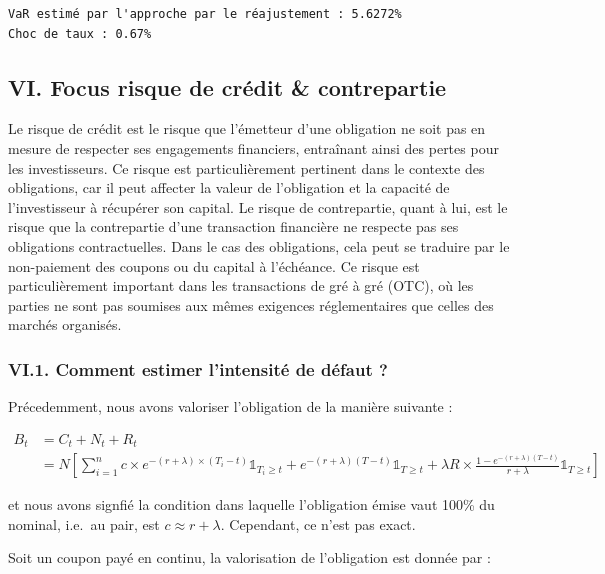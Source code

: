 \documentclass[
  letterpaper,
  DIV=11,
  numbers=noendperiod]{scrartcl}
\begin{document}
\begin{verbatim}
VaR estimé par l'approche par le réajustement : 5.6272%
Choc de taux : 0.67%
\end{verbatim}

\subsection{VI. Focus risque de crédit \&
contrepartie}\label{vi.-focus-risque-de-cruxe9dit-contrepartie}

Le risque de crédit est le risque que l'émetteur d'une obligation ne
soit pas en mesure de respecter ses engagements financiers, entraînant
ainsi des pertes pour les investisseurs. Ce risque est particulièrement
pertinent dans le contexte des obligations, car il peut affecter la
valeur de l'obligation et la capacité de l'investisseur à récupérer son
capital. Le risque de contrepartie, quant à lui, est le risque que la
contrepartie d'une transaction financière ne respecte pas ses
obligations contractuelles. Dans le cas des obligations, cela peut se
traduire par le non-paiement des coupons ou du capital à l'échéance. Ce
risque est particulièrement important dans les transactions de gré à gré
(OTC), où les parties ne sont pas soumises aux mêmes exigences
réglementaires que celles des marchés organisés.

\subsubsection{VI.1. Comment estimer l'intensité de défaut
?}\label{vi.1.-comment-estimer-lintensituxe9-de-duxe9faut}

Précedemment, nous avons valoriser l'obligation de la manière suivante :

\[
\begin{aligned}
B_t &= C_t + N_t + R_t \\
&= N \left[ \sum_{i=1}^{n}  c \times e^{-(r + \lambda) \times (T_i
-t)} \mathbb{1}_{T_i \geq t} + e^{-(r+\lambda)(T-t)} \mathbb{1}_{T \geq t} +  \lambda R \times \frac{1 - e^{-(r+\lambda)(T-t)}}{r+\lambda} \mathbb{1}_{T \geq t} \right]
\end{aligned}
\]

et nous avons signfié la condition dans laquelle l'obligation émise vaut
100\% du nominal, i.e.~au pair, est \(c \approx r + \lambda\).
Cependant, ce n'est pas exact.

Soit un coupon payé en continu, la valorisation de l'obligation est
donnée par :
\end{document}
